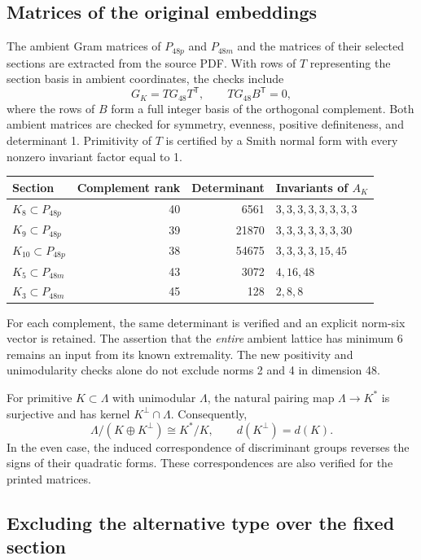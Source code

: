 \documentclass[11pt,a4paper]{article}
\theoremstyle{remark}\newtheorem{remark}[theorem]{Remark}
\begin{document}
\subsection{Matrices of the original embeddings}

The ambient Gram matrices of $P_{48p}$ and $P_{48m}$ and the matrices of their selected sections are extracted from the source PDF. With rows of $T$ representing the section basis in ambient coordinates, the checks include
\[
G_K=T G_{48}T^{\mathsf T},\qquad
T G_{48}B^{\mathsf T}=0,
\]
where the rows of $B$ form a full integer basis of the orthogonal complement. Both ambient matrices are checked for symmetry, evenness, positive definiteness, and determinant 1. Primitivity of $T$ is certified by a Smith normal form with every nonzero invariant factor equal to 1.

\begin{center}
\begin{tabular}{lrrl}
\toprule
Section &Complement rank&Determinant&Invariants of $A_K$\\\midrule
$K_8\subset P_{48p}$&40&6561&$3,3,3,3,3,3,3,3$\\
$K_9\subset P_{48p}$&39&21870&$3,3,3,3,3,3,30$\\
$K_{10}\subset P_{48p}$&38&54675&$3,3,3,3,15,45$\\
$K_5\subset P_{48m}$&43&3072&$4,16,48$\\
$K_3\subset P_{48m}$&45&128&$2,8,8$\\
\bottomrule
\end{tabular}
\end{center}

For each complement, the same determinant is verified and an explicit norm-six vector is retained. The assertion that the \emph{entire} ambient lattice has minimum 6 remains an input from its known extremality. The new positivity and unimodularity checks alone do not exclude norms 2 and 4 in dimension 48.

For primitive $K\subset\Lambda$ with unimodular $\Lambda$, the natural pairing map $\Lambda\to K^*$ is surjective and has kernel $K^\perp\cap\Lambda$. Consequently,
\[
\Lambda/(K\oplus K^\perp)\cong K^*/K,\qquad
d(K^\perp)=d(K).
\]
In the even case, the induced correspondence of discriminant groups reverses the signs of their quadratic forms. These correspondences are also verified for the printed matrices.

\subsection{Excluding the alternative type over the fixed section}
\end{document}
